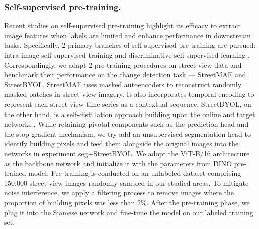 \documentclass[letterpaper]{article} %
\begin{document}

\subsubsection{Self-supervised pre-training.}
Recent studies on self-supervised pre-training highlight its efficacy to extract image features when labels are limited and enhance performance in downstream tasks. Specifically, 2 primary branches of self-supervised pre-training are pursued: intra-image self-supervised training \cite{He2022masked,satmae2022} and discriminative self-supervised learning \cite{grill2020bootstrap}. Correspondingly, we adapt 2 pre-training procedures on street view data and benchmark their performance on the change detection task --- StreetMAE and StreetBYOL. StreetMAE uses masked autoencoders \cite{He2022masked} to reconstruct randomly masked patches in street view imagery. It also incorporates temporal encoding to represent each street view time series as a contextual sequence. StreetBYOL, on the other hand, is a self-distillation approach building upon the online and target networks \cite{grill2020bootstrap}. While retaining pivotal components such as the prediction head and the stop gradient mechanism, we try add an unsupervised segmentation head \cite{hamilton2021unsupervised} to identify building pixels and feed them alongside the original images into the networks in experiment seg+StreetBYOL. We adopt the ViT-B/16 architecture as the backbone network and initialize it with the parameters from DINO pre-trained model. Pre-training is conducted on an unlabeled dataset comprising 150,000 street view images randomly sampled in our studied areas. To mitigate noise interference, we apply a filtering process to remove images where the proportion of building pixels was less than $2\%$. After the pre-training phase, we plug it into the Siamese network and fine-tune the model on our labeled training set. 
\end{document}

